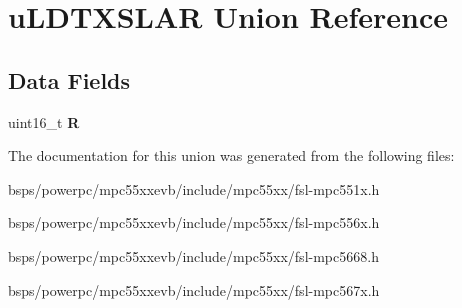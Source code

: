 \hypertarget{unionuLDTXSLAR}{}\section{u\+L\+D\+T\+X\+S\+L\+AR Union Reference}
\label{unionuLDTXSLAR}
\subsection*{Data Fields}
\begin{DoxyCompactItemize}
\item 
\mbox{\label{unionuLDTXSLAR_aa9b92213b9da786652eb4a5a92ef6e44}} 
uint16\+\_\+t {\bfseries R}
\end{DoxyCompactItemize}


The documentation for this union was generated from the following files\+:\begin{DoxyCompactItemize}
\item 
bsps/powerpc/mpc55xxevb/include/mpc55xx/fsl-\/mpc551x.\+h\item 
bsps/powerpc/mpc55xxevb/include/mpc55xx/fsl-\/mpc556x.\+h\item 
bsps/powerpc/mpc55xxevb/include/mpc55xx/fsl-\/mpc5668.\+h\item 
bsps/powerpc/mpc55xxevb/include/mpc55xx/fsl-\/mpc567x.\+h\end{DoxyCompactItemize}
